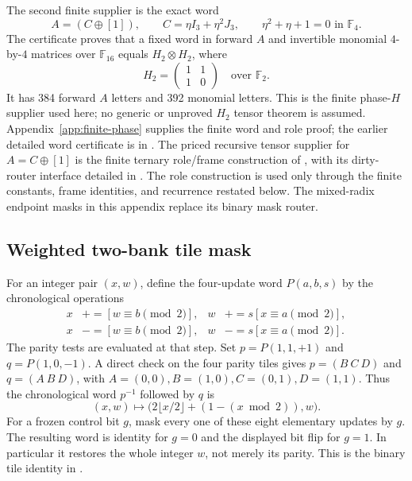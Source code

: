 The second finite supplier is the exact word
\[
 A=(C\oplus[1]),\qquad C=\eta I_3+\eta^2J_3,\qquad
 \eta^2+\eta+1=0\text{ in }\mathbb F_4.
\]
The certificate proves that a fixed word in forward $A$ and invertible
monomial $4$-by-$4$ matrices over $\mathbb F_{16}$ equals
$H_2\otimes H_2$, where
\[
 H_2=\begin{pmatrix}1&1\\1&0\end{pmatrix}\quad\text{over }\mathbb F_2.
\]
It has 384 forward $A$ letters and 392 monomial letters.  This is the
finite phase-$H$ supplier used here; no generic or unproved $H_2$ tensor
theorem is assumed.  Appendix~\ref{app:finite-phase} supplies the finite
word and role proof; the earlier detailed word certificate is in
.
The priced recursive tensor supplier for $A=C\oplus[1]$ is the finite
ternary role/frame construction of
, with its dirty-router
interface detailed in .  The role
construction is used only through the finite constants, frame identities,
and recurrence restated below.  The mixed-radix endpoint masks in this
appendix replace its binary mask router.

\subsection{Weighted two-bank tile mask}
\label{sec:weighted-native-mask}

For an integer pair $(x,w)$, define the four-update word $P(a,b,s)$ by
the chronological operations
\[
\begin{aligned}
 x&\mathrel{+}= [w\equiv b\pmod2], &
 w&\mathrel{+}=s[x\equiv a\pmod2],\\
 x&\mathrel{-}= [w\equiv b\pmod2], &
 w&\mathrel{-}=s[x\equiv a\pmod2].
\end{aligned}
\]
The parity tests are evaluated at that step.  Set
$p=P(1,1,+1)$ and $q=P(1,0,-1)$.  A direct check on the four parity
tiles gives $p=(B\ C\ D)$ and $q=(A\ B\ D)$, with
$A=(0,0),B=(1,0),C=(0,1),D=(1,1)$.  Thus the chronological word
$p^{-1}$ followed by $q$ is
\[
 (x,w)\longmapsto
 \bigl(2\lfloor x/2\rfloor+(1-(x\bmod2)),w\bigr).
\]
For a frozen control bit $g$, mask every one of these eight elementary
updates by $g$.  The resulting word is identity for $g=0$ and the displayed
bit flip for $g=1$.  In particular it restores the whole integer $w$,
not merely its parity.  This is the binary tile identity in
.

